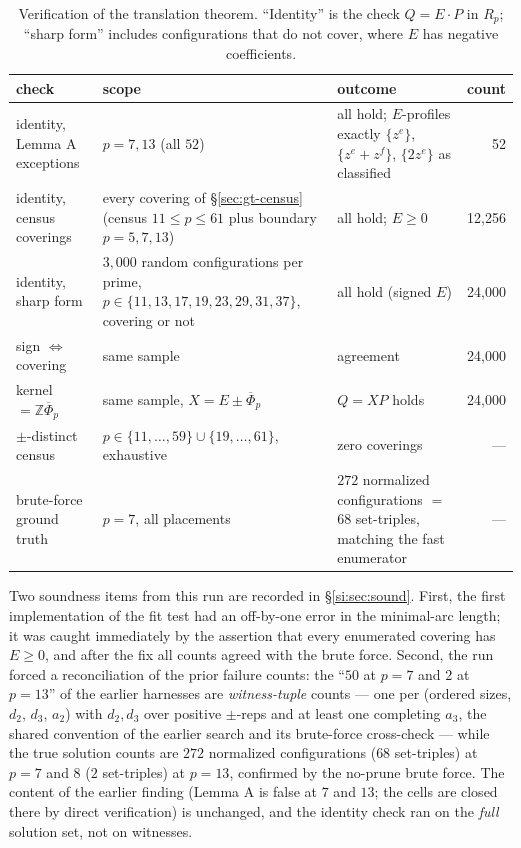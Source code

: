 \documentclass[11pt,a4paper]{article}
\numberwithin{equation}{section}
\theoremstyle{plain}
\theoremstyle{plain}
\theoremstyle{definition}
\theoremstyle{remark}
\newcommand{\Z}{\mathbb{Z}}
\begin{document}
\begin{table}[t]
\centering
\small
\caption{Verification of the translation theorem. ``Identity'' is the check
$Q=E\cdot P$ in $R_p$; ``sharp form'' includes configurations that do not
cover, where $E$ has negative coefficients.}
\label{tab:gtverify}
\begin{tabularx}{\textwidth}{@{}lXXr@{}}
\toprule
check & scope & outcome & count \\
\midrule
identity, Lemma A exceptions & $p=7,13$ (all $52$) & all hold; $E$-profiles
exactly $\{z^e\}$, $\{z^e{+}z^f\}$, $\{2z^e\}$ as classified & 52 \\
identity, census coverings & every covering of \S\ref{sec:gt-census}
(census $11\le p\le 61$ plus boundary $p=5,7,13$) & all hold; $E\ge 0$ & 12{,}256 \\
identity, sharp form & $3{,}000$ random configurations per prime, $p\in\{11,
13,17,19,23,29,31,37\}$, covering or not & all hold (signed $E$) & 24{,}000 \\
sign $\Leftrightarrow$ covering & same sample & agreement & 24{,}000 \\
kernel $=\Z\overline\Phi_p$ & same sample, $X=E\pm\overline\Phi_p$ &
$Q=XP$ holds & 24{,}000 \\
$\pm$-distinct census & $p\in\{11,\dots,59\}\cup\{19,\dots,61\}$, exhaustive
& zero coverings & --- \\
brute-force ground truth & $p=7$, all placements & $272$ normalized
configurations $=$ $68$ set-triples, matching the fast enumerator & --- \\
\bottomrule
\end{tabularx}
\end{table}

Two soundness items from this run are recorded in \S\ref{si:sec:sound}. First,
the first implementation of the fit test had an off-by-one error in the
minimal-arc length; it was caught immediately by the assertion that every
enumerated covering has $E\ge 0$, and after the fix all counts agreed with
the brute force. Second, the run forced a reconciliation of the prior
failure counts: the ``$50$ at $p=7$ and $2$ at $p=13$'' of the earlier
harnesses are \emph{witness-tuple} counts --- one per (ordered sizes,
$d_2$, $d_3$, $a_2$) with $d_2,d_3$ over positive $\pm$-reps and at least
one completing $a_3$, the shared convention of the earlier search and its
brute-force cross-check --- while the true solution counts are $272$
normalized configurations ($68$ set-triples) at $p=7$ and $8$
($2$ set-triples) at $p=13$, confirmed by the no-prune brute force. The
content of the earlier finding (Lemma A is false at $7$ and $13$; the cells
are closed there by direct verification) is unchanged, and the identity
check ran on the \emph{full} solution set, not on witnesses.
\end{document}

